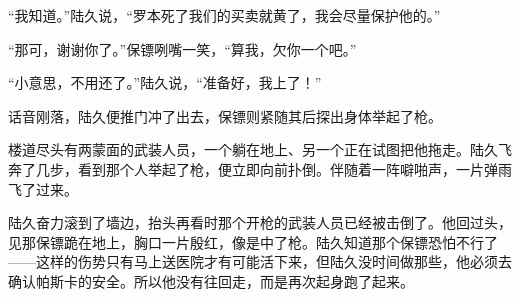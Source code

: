 “我知道。”陆久说，“罗本死了我们的买卖就黄了，我会尽量保护他的。”

“那可，谢谢你了。”保镖咧嘴一笑，“算我，欠你一个吧。”

“小意思，不用还了。”陆久说，“准备好，我上了！”

话音刚落，陆久便推门冲了出去，保镖则紧随其后探出身体举起了枪。

楼道尽头有两蒙面的武装人员，一个躺在地上、另一个正在试图把他拖走。陆久飞奔了几步，看到那个人举起了枪，便立即向前扑倒。伴随着一阵噼啪声，一片弹雨飞了过来。

陆久奋力滚到了墙边，抬头再看时那个开枪的武装人员已经被击倒了。他回过头，见那保镖跪在地上，胸口一片殷红，像是中了枪。陆久知道那个保镖恐怕不行了——这样的伤势只有马上送医院才有可能活下来，但陆久没时间做那些，他必须去确认帕斯卡的安全。所以他没有往回走，而是再次起身跑了起来。